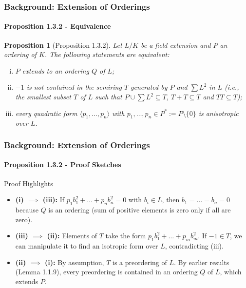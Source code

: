 \documentclass[11pt]{beamer}
\newtheorem{proposition}{Proposition}
\begin{document}
\begin{frame}
    \frametitle{Background: Extension of Orderings}
    \framesubtitle{Proposition 1.3.2 - Equivalence}
    
    \begin{proposition}[Proposition 1.3.2]
        Let $L/K$ be a field extension and $P$ an ordering of $K$. The following statements are equivalent:
        \begin{enumerate}[(i)]
            \setlength{\itemsep}{0.3em}
            \item $P$ extends to an ordering $Q$ of $L$;
            \item $-1$ is not contained in the semiring $T$ generated by $P$ and $\sum L^2$ in $L$ (i.e., the smallest subset $T$ of $L$ such that $P \cup \sum L^2 \subseteq T$, $T + T \subseteq T$ and $TT \subseteq T$);
            \item every quadratic form $\langle p_1, \dots, p_n \rangle$ with $p_1, \dots, p_n \in P^* := P \setminus \{0\}$ is anisotropic over $L$.
        \end{enumerate}
    \end{proposition}
\end{frame}

\begin{frame}
    \frametitle{Background: Extension of Orderings}
    \framesubtitle{Proposition 1.3.2 - Proof Sketches}
    
    \begin{block}{Proof Highlights}
        \begin{itemize}
            \setlength{\itemsep}{0.6em}
            \item \textbf{(i) $\implies$ (iii):} If $p_1 b_1^2 + \dots + p_n b_n^2 = 0$ with $b_i \in L$, then $b_1 = \dots = b_n = 0$ because $Q$ is an ordering (sum of positive elements is zero only if all are zero).
            \item \textbf{(iii) $\implies$ (ii):} Elements of $T$ take the form $p_1 b_1^2 + \dots + p_m b_m^2$. If $-1 \in T$, we can manipulate it to find an isotropic form over $L$, contradicting (iii).
            \item \textbf{(ii) $\implies$ (i):} By assumption, $T$ is a preordering of $L$. By earlier results (Lemma 1.1.9), every preordering is contained in an ordering $Q$ of $L$, which extends $P$.
        \end{itemize}
    \end{block}
\end{frame}
\end{document}
